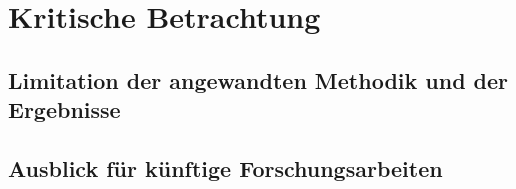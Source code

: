 \section{Kritische Betrachtung}
\subsection{Limitation der angewandten Methodik und der Ergebnisse}
\subsection{Ausblick für künftige Forschungsarbeiten}